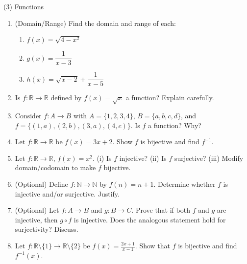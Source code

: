 \documentclass[12pt]{article}
\begin{document}
\begin{sectbox}{(3) Functions}
\begin{enumerate}[label=\textbf{F\arabic*:}]
\item (Domain/Range) Find the domain and range of each:
\begin{enumerate}[label=(\alph*)]
\item $f(x)=\sqrt{4-x^2}$ \qquad
\item $g(x)=\dfrac{1}{x-3}$ \qquad
\item $h(x)=\sqrt{x-2}+\dfrac{1}{x-5}$
\end{enumerate}

\item Is $f:\mathbb{R}\to\mathbb{R}$ defined by $f(x)=\sqrt{x}$ a function? Explain carefully.

\item Consider $f:A\to B$ with $A=\{1,2,3,4\}$, $B=\{a,b,c,d\}$, and $f=\{(1,a),(2,b),(3,a),(4,c)\}$. Is $f$ a function? Why?

\item Let $f:\mathbb{R}\to\mathbb{R}$ be $f(x)=3x+2$. Show $f$ is bijective and find $f^{-1}$.

\item Let $f:\mathbb{R}\to\mathbb{R}$, $f(x)=x^2$. (i) Is $f$ injective? (ii) Is $f$ surjective? (iii) Modify domain/codomain to make $f$ bijective.

\item (Optional) Define $f:\mathbb{N}\to\mathbb{N}$ by $f(n)=n+1$. Determine whether $f$ is injective and/or surjective. Justify.

\item (Optional) Let $f:A\to B$ and $g:B\to C$. Prove that if both $f$ and $g$ are injective, then $g\circ f$ is injective. Does the analogous statement hold for surjectivity? Discuss.

\item Let $f:\mathbb{R}\setminus\{1\}\to\mathbb{R}\setminus\{2\}$ be $\displaystyle f(x)=\frac{2x+1}{x-1}$. Show that $f$ is bijective and find $f^{-1}(x)$.
\end{enumerate}
\end{sectbox}

\end{document}
